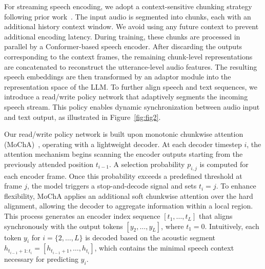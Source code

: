 \documentclass{article}
\begin{document}

For streaming speech encoding, we adopt a context-sensitive chunking strategy following prior work~\cite{an22_interspeech}.
The input audio is segmented into chunks, each with an additional history context window. We avoid using any future context to prevent additional encoding latency.
During training, these chunks are processed in parallel by a Conformer-based speech encoder. After discarding the outputs corresponding to the context frames, the remaining chunk-level representations are concatenated to reconstruct the utterance-level audio features.
The resulting speech embeddings are then transformed by an adaptor module into the representation space of the LLM. 
To further align speech and text sequences, we introduce a read/write policy network that adaptively segments the incoming speech stream. This policy enables dynamic synchronization between audio input and text output, as illustrated in Figure~\ref{fig:fig2}.



Our read/write policy network is built upon monotonic chunkwise attention (MoChA)~\cite{chiu2018monotonic}, operating with a lightweight decoder.
At each decoder timestep $i$, the attention mechanism begins scanning the encoder outputs starting from the previously attended position $t_{i-1}$.
A selection probability $p_{i,j}$ is computed for each encoder frame. Once this probability exceeds a predefined threshold at frame $j$, the model triggers a stop-and-decode signal and sets $t_i = j$.
To enhance flexibility, MoChA applies an additional soft chunkwise attention over the hard alignment, allowing the decoder to aggregate information within a local region.
This process generates an encoder index sequence $[t_1, \dots, t_{L}]$ that aligns synchronously with the output tokens $[y_2, \dots, y_L]$, where $t_1=0$.
Intuitively, each token $y_{i}$ for $i=\{2,\dots,L\}$ is decoded based on the acoustic segment $h_{t_{i-1} + 1:t_i} = [h_{t_{i-1} + 1}, \dots, h_{t_i}]$,  which contains the minimal speech context necessary for predicting $y_{i}$.
\end{document}
